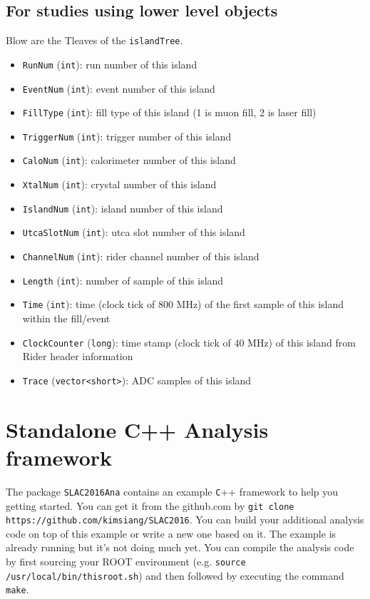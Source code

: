 \documentclass[12pt,letterpaper]{article}
\begin{document}
\subsection*{For studies using lower level objects}
Blow are the Tleaves of the \verb+islandTree+.

\begin{itemize}
\item \verb+RunNum+ (\verb+int+): run number of this island
\item \verb+EventNum+ (\verb+int+): event number of this island
\item \verb+FillType+ (\verb+int+): fill type of this island (1 is muon fill, 2 is laser fill)
\item \verb+TriggerNum+ (\verb+int+): trigger number of this island
\item \verb+CaloNum+ (\verb+int+): calorimeter number of this island
\item \verb+XtalNum+ (\verb+int+): crystal number of this island
\item \verb+IslandNum+ (\verb+int+): island number of this island
\item \verb+UtcaSlotNum+ (\verb+int+): utca slot number of this island
\item \verb+ChannelNum+ (\verb+int+): rider channel number of this island
\item \verb+Length+ (\verb+int+): number of sample of this island
\item \verb+Time+ (\verb+int+): time (clock tick of 800 MHz) of the first sample of this island within the fill/event
\item \verb+ClockCounter+ (\verb+long+): time stamp (clock tick of 40 MHz) of this island from Rider header information
\item \verb+Trace+ (\verb+vector<short>+): ADC samples of this island
\end{itemize}

\section{Standalone C++ Analysis framework}

The package \verb+SLAC2016Ana+ contains an example \verb+C+++ framework to help you getting started. You can get it from the github.com by \verb+git clone https://github.com/kimsiang/SLAC2016+. You can build your additional analysis code on top of this example or write a new one based on it. The example is already running but it's not doing much yet. You can compile the analysis code by first sourcing your ROOT environment (e.g. \verb+source /usr/local/bin/thisroot.sh+) and then followed by executing the command \verb+make+.
\end{document}
